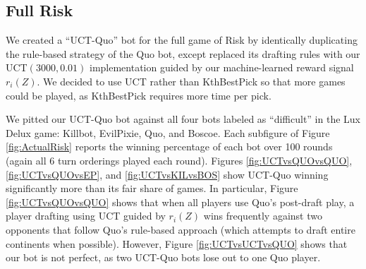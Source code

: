 \documentclass[letterpaper]{article}
\numberwithin{equation}{section}
\numberwithin{theorem}{section}
\numberwithin{lemma}{section}
\numberwithin{df}{section}
\begin{document}
\subsection{Full Risk}


We created a ``UCT-Quo'' bot for the full game of Risk by identically duplicating the rule-based strategy of the Quo bot, except replaced its drafting rules with our UCT$(3000,0.01)$ implementation guided by our machine-learned reward signal $r_i(Z)$.  We decided to use UCT rather than KthBestPick so that more games could be played, as KthBestPick requires more time per pick.  

We pitted our UCT-Quo bot against all four bots labeled as ``difficult'' in the Lux Delux game: Killbot, EvilPixie, Quo, and Boscoe.  Each subfigure of Figure \ref{fig:ActualRisk} reports the winning percentage of each bot over 100 rounds (again all 6 turn orderings played each round).  Figures \ref{fig:UCTvsQUOvsQUO}, \ref{fig:UCTvsQUOvsEP}, and \ref{fig:UCTvsKILvsBOS} show UCT-Quo winning significantly more than its fair share of games.  In particular, Figure \ref{fig:UCTvsQUOvsQUO} shows that when all players use Quo's post-draft play, a player drafting using UCT guided by $r_i(Z)$ wins frequently against two opponents that follow Quo's rule-based approach (which attempts to draft entire continents when possible).  However, Figure \ref{fig:UCTvsUCTvsQUO} shows that our bot is not perfect, as two UCT-Quo bots lose out to one Quo player.  

\end{document}
